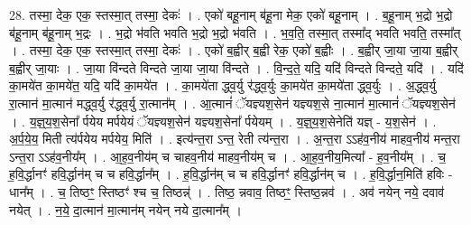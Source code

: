 \documentclass[17pt]{extarticle}
\begin{document}
28. तस्मा॒ देक॒ एक॒ स्तस्मा॒त् तस्मा॒ देकः॑ । . एको॑ बहू॒नाम् ब॑हू॒ना मेक॒ एको॑ बहू॒नाम् । . ब॒हू॒नाम् भ॒द्रो भ॒द्रो ब॑हू॒नाम् ब॑हू॒नाम् भ॒द्रः । . भ॒द्रो भ॑वति भवति भ॒द्रो भ॒द्रो भ॑वति । . भ॒व॒ति॒ तस्मा॒त् तस्मा᳚द् भवति भवति॒ तस्मा᳚त् । . तस्मा॒ देक॒ एक॒ स्तस्मा॒त् तस्मा॒ देकः॑ । . एको॑ ब॒ह्वीर् ब॒ह्वी रेक॒ एको॑ ब॒ह्वीः । . ब॒ह्वीर् जा॒या जा॒या ब॒ह्वीर् ब॒ह्वीर् जा॒याः । . जा॒या वि॑न्दते विन्दते जा॒या जा॒या वि॑न्दते । . वि॒न्द॒ते॒ यदि॒ यदि॑ विन्दते विन्दते॒ यदि॑ । . यदि॑ का॒मये॑त का॒मये॑त॒ यदि॒ यदि॑ का॒मये॑त । . का॒मये॑ता द्ध्व॒र्यु र॑द्ध्व॒र्युः का॒मये॑त का॒मये॑ता द्ध्व॒र्युः । . अ॒द्ध्व॒र्यु रा॒त्मान॑ मा॒त्मान॑ मद्ध्व॒र्यु र॑द्ध्व॒र्यु रा॒त्मान᳚म् । . आ॒त्मानं॑ ॅयज्ञ्यश॒सेन॑ यज्ञ्यश॒से ना॒त्मान॑ मा॒त्मानं॑ ॅयज्ञ्यश॒सेन॑ । . य॒ज्ञ्॒य॒श॒सेना᳚ र्पयेय मर्पयेयं ॅयज्ञ्यश॒सेन॑ यज्ञ्यश॒सेना᳚ र्पयेयम् । . य॒ज्ञ्॒य॒श॒सेनेति॑ यज्ञ् - य॒श॒सेन॑ । . अ॒र्प॒ये॒य॒ मिती त्य॑र्पयेय मर्पयेय॒ मिति॑ । . इत्य॑न्त॒रा ऽन्त॒ रेती त्य॑न्त॒रा । . अ॒न्त॒रा ऽऽह॑व॒नीय॑ माहव॒नीय॑ मन्त॒रा ऽन्त॒रा ऽऽह॑व॒नीय᳚म् । . आ॒ह॒व॒नीय॑म् च चाहव॒नीय॑ माहव॒नीय॑म् च । . आ॒ह॒व॒नीय॒मित्या᳚ - ह॒व॒नीय᳚म् । . च॒ ह॒वि॒र्द्धानꣳ॑ हवि॒र्द्धान॑म् च च हवि॒र्द्धान᳚म् । . ह॒वि॒र्द्धान॑म् च च हवि॒र्द्धानꣳ॑ हवि॒र्द्धान॑म् च । . ह॒वि॒र्द्धान॒मिति॑ हविः - धान᳚म् । . च॒ तिष्ठꣳ॒॒ स्तिष्ठꣳ॑ श्च च॒ तिष्ठन्न्॑ । . तिष्ठ॒ न्नवाव॒ तिष्ठꣳ॒॒ स्तिष्ठ॒न्नव॑ । . अव॑ नयेन् नये॒ दवाव॑ नयेत् । . न॒ये॒ दा॒त्मान॑ मा॒त्मान॑म् नयेन् नये दा॒त्मान᳚म् । \newline
\end{document}
